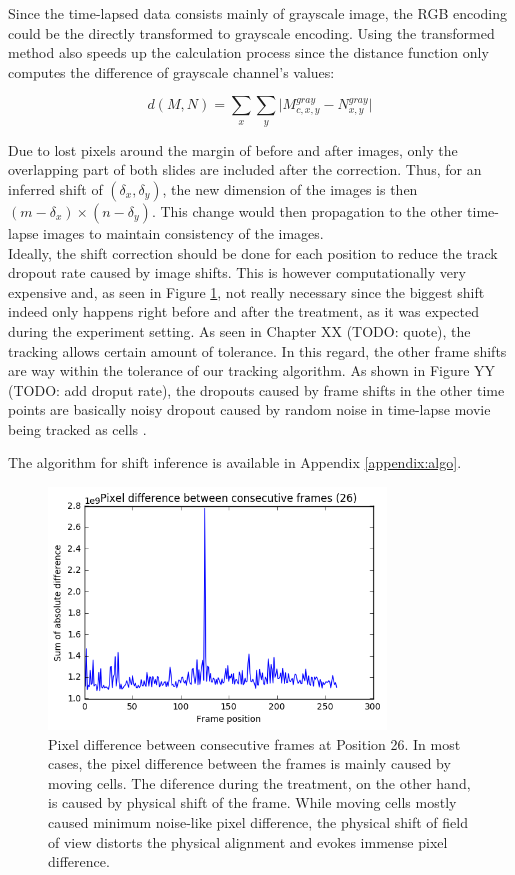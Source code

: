 \documentclass[pdftex,12pt,a4paper]{report}
\begin{document}

Since the time-lapsed data consists mainly of grayscale image, the RGB encoding could be the directly transformed to grayscale encoding. Using the transformed method also speeds up the calculation process since the distance function only computes the difference of grayscale channel's values:

$$
d(M, N) =  \sum_{x} \sum_{y} \vert M_{c, x, y}^{gray} - N_{x, y}^{gray}\vert
$$

Due to lost pixels around the margin of before and after images, only the overlapping part of both slides are included after the correction. Thus, for an inferred shift of $(\delta_x, \delta_y)$, the new dimension of the images is then $(m - \delta_x) \times (n - \delta_y)$. This change would then propagation to the other time-lapse images to maintain consistency of the images.\\

Ideally, the shift correction should be done for each position to reduce the track dropout rate caused by image shifts. This is however computationally very expensive and, as seen in Figure \ref{fig:pixdiff}, not really necessary since the biggest shift indeed only happens right before and after the treatment, as it was expected during the experiment setting. As seen in Chapter XX (TODO: quote), the tracking allows certain amount of tolerance. In this regard, the other frame shifts are way within the tolerance of our tracking algorithm. As shown in Figure YY (TODO: add droput rate), the dropouts caused by frame shifts in the other time points are basically noisy dropout caused by random noise in time-lapse movie being tracked as cells \cite{jaqaman2008robust}.

The algorithm for shift inference is available in Appendix \ref{appendix:algo}.

\begin{figure}[H]
\centering
\includegraphics[width=0.8\textwidth]{images/pixdiff}
\caption{Pixel difference between consecutive frames at Position 26. In most cases, the pixel difference between the frames is mainly caused by moving cells. The diference during the treatment, on the other hand, is caused by physical shift of the frame. While moving cells mostly caused minimum noise-like pixel difference, the physical shift of field of view distorts the physical alignment and evokes immense pixel difference.}
\label{fig:pixdiff}
\end{figure}
\end{document}

